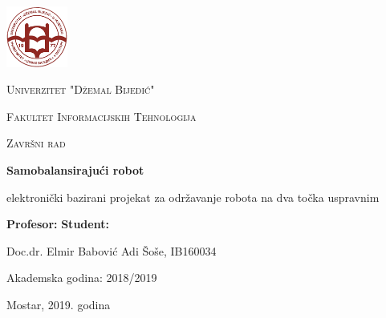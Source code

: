 \documentclass[../Document.tex]{subfiles}
\begin{document}
\begin{titlepage}
    \centering
    \includegraphics[width=0.15\textwidth]{Images/Logo_UNMO.png}\par
    \vspace{1cm}
    {\scshape\LARGE Univerzitet "Džemal Bijedić" \par}
    {\scshape\Large Fakultet Informacijskih Tehnologija \par}

    \vspace{2.5cm}
    {\scshape\Large Završni rad\par}
    \vspace{0.7cm}

    {\huge\bfseries Samobalansirajući robot\par}
    \vspace{0.5cm}
    elektronički bazirani projekat za održavanje robota na dva točka uspravnim\par

    \vfill

    \textbf{Profesor:}
    \hfill
    \textbf{{Student:}}\par
    Doc.dr. Elmir Babović
    \hfill
    Adi Šoše, IB160034\par

    \vspace{1cm}
    Akademska godina: 2018/2019\par
    \vspace{0.3cm}
    Mostar, 2019. godina
\end{titlepage}
\restoregeometry
\end{document}
